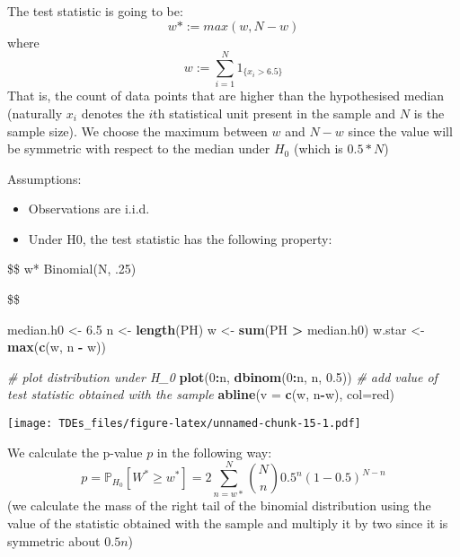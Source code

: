 \documentclass[
]{article}
\newenvironment{Shaded}{\begin{snugshade}}{\end{snugshade}}
\newcommand{\AttributeTok}[1]{\textcolor[rgb]{0.13,0.29,0.53}{#1}}
\newcommand{\CommentTok}[1]{\textcolor[rgb]{0.56,0.35,0.01}{\textit{#1}}}
\newcommand{\DecValTok}[1]{\textcolor[rgb]{0.00,0.00,0.81}{#1}}
\newcommand{\FloatTok}[1]{\textcolor[rgb]{0.00,0.00,0.81}{#1}}
\newcommand{\FunctionTok}[1]{\textcolor[rgb]{0.13,0.29,0.53}{\textbf{#1}}}
\newcommand{\NormalTok}[1]{#1}
\newcommand{\OtherTok}[1]{\textcolor[rgb]{0.56,0.35,0.01}{#1}}
\newcommand{\SpecialCharTok}[1]{\textcolor[rgb]{0.81,0.36,0.00}{\textbf{#1}}}
\newcommand{\StringTok}[1]{\textcolor[rgb]{0.31,0.60,0.02}{#1}}
\providecommand{\tightlist}{%
  \setlength{\itemsep}{0pt}\setlength{\parskip}{0pt}}
\begin{document}
The test statistic is going to be: \[w* := max(w, N-w)\] where \[
w := \sum_{i=1}^{N} \mathcal{1}_{\{x_i > 6.5 \}}
\] That is, the count of data points that are higher than the
hypothesised median (naturally \(x_i\) denotes the \(i\)th statistical
unit present in the sample and \(N\) is the sample size). We choose the
maximum between \(w\) and \(N-w\) since the value will be symmetric with
respect to the median under \(H_0\) (which is \(0.5 * N\))

Assumptions:

\begin{itemize}
\tightlist
\item
  Observations are i.i.d.
\item
  Under H0, the test statistic has the following property:
\end{itemize}

\$\$ w*  Binomial(N, .25)

\$\$

\begin{Shaded}
\begin{Highlighting}[]
\NormalTok{median.h0 }\OtherTok{\textless{}{-}} \FloatTok{6.5}
\NormalTok{n }\OtherTok{\textless{}{-}} \FunctionTok{length}\NormalTok{(PH)}
\NormalTok{w }\OtherTok{\textless{}{-}} \FunctionTok{sum}\NormalTok{(PH }\SpecialCharTok{\textgreater{}}\NormalTok{ median.h0)}
\NormalTok{w.star }\OtherTok{\textless{}{-}} \FunctionTok{max}\NormalTok{(}\FunctionTok{c}\NormalTok{(w, n }\SpecialCharTok{{-}}\NormalTok{ w))}

\CommentTok{\# plot distribution under H\_0}
\FunctionTok{plot}\NormalTok{(}\DecValTok{0}\SpecialCharTok{:}\NormalTok{n, }\FunctionTok{dbinom}\NormalTok{(}\DecValTok{0}\SpecialCharTok{:}\NormalTok{n, n, }\FloatTok{0.5}\NormalTok{))}
\CommentTok{\# add value of test statistic obtained with the sample}
\FunctionTok{abline}\NormalTok{(}\AttributeTok{v =} \FunctionTok{c}\NormalTok{(w, n}\SpecialCharTok{{-}}\NormalTok{w), }\AttributeTok{col=}\StringTok{\textquotesingle{}red\textquotesingle{}}\NormalTok{)}
\end{Highlighting}
\end{Shaded}

\texttt{[image: TDEs\_files/figure-latex/unnamed-chunk-15-1.pdf]}

We calculate the p-value \(p\) in the following way: \[
p = \mathbb{P}_{H_0}[W^* \geq w^* ] = 2 \sum_{n=w*}^N \binom{N}{n}0.5^n(1-0.5)^{N-n}
\] (we calculate the mass of the right tail of the binomial distribution
using the value of the statistic obtained with the sample and multiply
it by two since it is symmetric about \(0.5n\))
\end{document}
